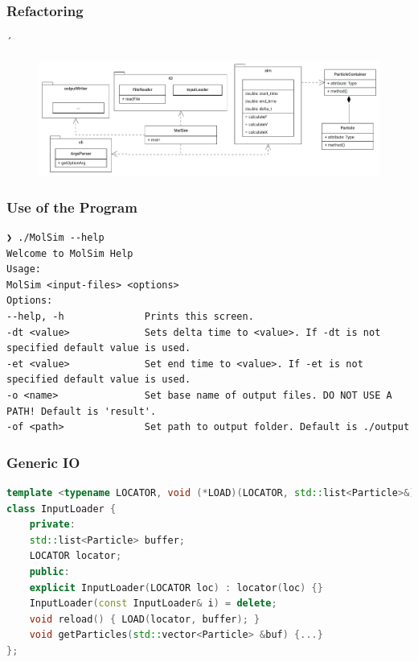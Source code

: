 
\begin{frame}
\frametitle{Refactoring}
\vspace{-0.5cm}
´\begin{figure}
	\centering
	\includegraphics[height=0.5\textheight]{UMLClassDiagram-1}
	\label{fig:umlclassdiagram-1}
\end{figure}
\end{frame}

\begin{frame}[fragile]
	\frametitle{Use of the Program}
	\vspace{0.7cm}
	\begin{Verbatim}
❯ ./MolSim --help
Welcome to MolSim Help
Usage:
MolSim <input-files> <options>
Options:
--help, -h              Prints this screen.
-dt <value>             Sets delta time to <value>. If -dt is not specified default value is used.
-et <value>             Set end time to <value>. If -et is not specified default value is used.
-o <name>               Set base name of output files. DO NOT USE A PATH! Default is 'result'.
-of <path>              Set path to output folder. Default is ./output
	\end{Verbatim}
\end{frame}

\begin{frame}[fragile]
\frametitle{Generic IO}
\vspace{0.7cm}
\begin{lstlisting}[language=C++]
template <typename LOCATOR, void (*LOAD)(LOCATOR, std::list<Particle>&)>
class InputLoader {
	private:
	std::list<Particle> buffer;
	LOCATOR locator;
	public:
	explicit InputLoader(LOCATOR loc) : locator(loc) {}
	InputLoader(const InputLoader& i) = delete;
	void reload() { LOAD(locator, buffer); }
	void getParticles(std::vector<Particle> &buf) {...}
};
\end{lstlisting}
\end{frame}

